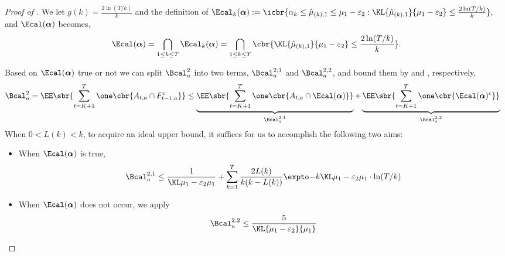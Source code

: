     \begin{proof}[Proof of ]
    We let $g(k) = \tfrac{2\ln(T/k)}{k}$ and the definition of $\Ecal_k(\boldsymbol{\alpha}):= \icbr{ \alpha_k \leq \hmu_{(k),1} \leq \mu_1-\varepsilon_2: \KL{\hmu_{(k),1}}{\mu_1-\varepsilon_2} \leq \tfrac{2\ln(T/k)}{k} }$,
    and $\Ecal(\boldsymbol{\alpha})$ becomes,
        \[
            \Ecal(\boldsymbol{\alpha}) = \bigcap_{1\leq k\leq T} \Ecal_k(\boldsymbol{\alpha}) = \bigcap_{1\leq k\leq T} \cbr{\KL{\hmu_{(k),1}}{\mu_1-\varepsilon_2} \leq \frac{2\ln(T/k)}{k} }.
        \]

    Based on $\Ecal(\boldsymbol{\alpha})$ true or not we can split $\Bcal^2_{a}$ into two terms, $\Bcal^{2,1}_{a}$ and $\Bcal^{2,2}_{a}$, and bound them by  and , respectively,
    \begin{align*}
        \Bcal^2_{a}
        &= 
        \EE \sbr{ 
            \sum_{t=K+1}^T
            \one\cbr{ A_{t,a} \cap F_{t-1,a}^c }
            }
        \leq
        \underbrace{
            \EE \sbr{ 
            \sum_{t=K+1}^T
            \one\cbr{ A_{t,a} \cap \Ecal(\boldsymbol{\alpha}) }
            }
        }_{\Bcal^{2,1}_{a}}
        +
        \underbrace{
            \EE \sbr{ 
            \sum_{t=K+1}^T
            \one\cbr{ \Ecal(\boldsymbol{\alpha})^c }
            }
        }_{\Bcal^{2,2}_{a}}
    \end{align*}
    When $0 < L(k) < k$, to acquire an ideal upper bound, it suffices for us to accomplish the following two aims:
    \begin{itemize}
        \item When $\Ecal(\boldsymbol{\alpha})$ is true,
        \[
            \Bcal^{2,1}_a \leq \ExpFThreeOneMO
        \]
        \item When $\Ecal(\boldsymbol{\alpha})$ does not occur, we apply 
        \[
            \Bcal^{2,2}_a \leq \frac{5}{\KL{\mu_1-\varepsilon_2}{\mu_1}}
        \]
    \end{itemize}
    

\end{proof}
